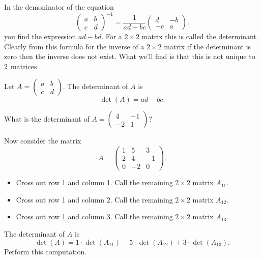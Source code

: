 In the demoninator of the equation
\[ \begin{pmatrix} a & b \\ c & d \end{pmatrix}^{-1} = \frac{1}{ad-bc} \begin{pmatrix} d &
    -b \\ -c & a \end{pmatrix}. \]
you find the expression $ad-bd$.  For a $2 \times 2$ matrix this is called the
determinant.  Clearly from this formula for the inverse of a $2\times 2$ matrix if the
determinant is zero then the inverse does not exist.  What we'll find is that this is not
unique to $2\time 2$ matrices.

\begin{definition}
    Let $A = \begin{pmatrix} a & b \\ c & d \end{pmatrix}$.  The determinant of $A$ is 
    \[ \det(A) = ad - bc. \]
\end{definition}

\begin{problem}
    What is the determinant of $A = \begin{pmatrix} 4 & -1 \\ -2 & 1 \end{pmatrix}$?
\end{problem}
%

\begin{problem}\label{prob:det_3}
    Now consider the matrix 
    \[ A = \begin{pmatrix} 1 & 5 & 3 \\ 2 & 4 & -1 \\ 0 & -2 & 0 \end{pmatrix}. \]
    \begin{itemize}
        \item Cross out row 1 and column 1. Call the remaining $2 \times 2$ matrix
            $A_{11}$.
        \item Cross out row 1 and column 2. Call the remaining $2 \times 2$ matrix
            $A_{12}$.
        \item Cross out row 1 and column 3. Call the remaining $2 \times 2$ matrix
            $A_{13}$.
    \end{itemize}
    The determinant of $A$ is
    \[ \det(A) = 1 \cdot \det(A_{11}) - 5 \cdot \det(A_{12}) + 3 \cdot \det(A_{13}). \]
    Perform this computation.
\end{problem}

